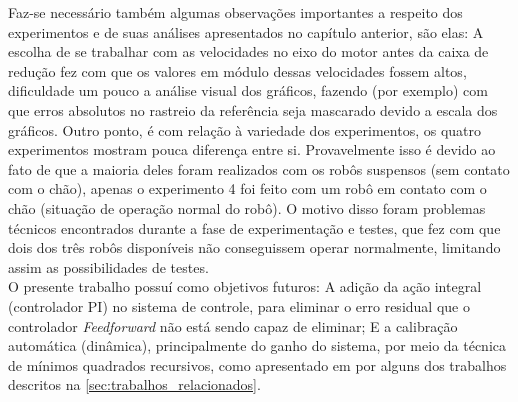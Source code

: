 Faz-se necessário também algumas observações importantes a respeito dos experimentos e de suas análises apresentados no capítulo anterior, são elas: A escolha de se trabalhar com as velocidades no eixo do motor antes da caixa de redução fez com que os valores em módulo dessas velocidades fossem altos, dificuldade um pouco a análise visual dos gráficos, fazendo (por exemplo) com que erros absolutos no rastreio da referência seja mascarado devido a escala dos gráficos. Outro ponto, é com relação à variedade dos experimentos, os quatro experimentos mostram pouca diferença entre si. Provavelmente isso é devido ao fato de que a maioria deles foram realizados com os robôs suspensos (sem contato com o chão), apenas o experimento 4 foi feito com um robô em contato com o chão (situação de operação normal do robô). O motivo disso foram problemas técnicos encontrados durante a fase de experimentação e testes, que fez com que dois dos três robôs disponíveis não conseguissem operar normalmente, limitando assim as possibilidades de testes.\\

O presente trabalho possuí como objetivos futuros: A adição da ação integral (controlador PI) no sistema de controle, para eliminar o erro residual que o controlador \emph{Feedforward} não está sendo capaz de eliminar; E a calibração automática (dinâmica), principalmente do ganho do sistema, por meio da técnica de mínimos quadrados recursivos, como apresentado em por alguns dos trabalhos descritos na \autoref{sec:trabalhos_relacionados}.

